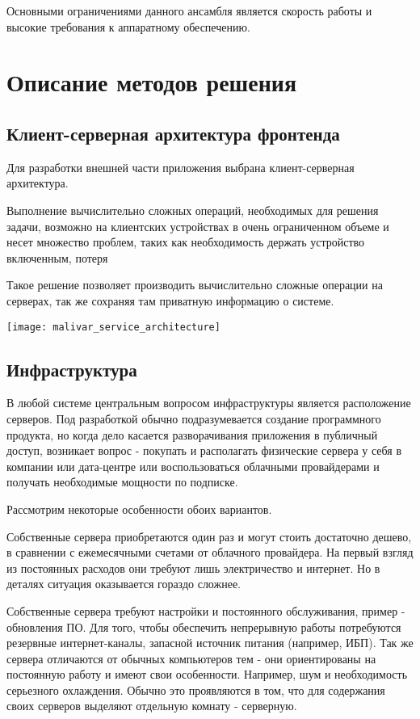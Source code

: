 Основными ограничениями данного ансамбля является скорость работы и высокие требования к аппаратному обеспечению.

\section{Описание методов решения}

\subsection{Клиент-серверная архитектура фронтенда}

Для разработки внешней части приложения выбрана клиент-серверная архитектура.

Выполнение вычислительно сложных операций, необходимых для решения задачи, возможно на клиентских устройствах в очень ограниченном объеме и несет множество проблем, таких как необходимость держать устройство включенным, потеря

Такое решение позволяет производить вычислительно сложные операции на серверах, так же сохраняя там приватную информацию о системе.

\texttt{[image: malivar\_service\_architecture]}

\subsection{Инфраструктура}

В любой системе центральным вопросом инфраструктуры является расположение серверов. Под разработкой обычно подразумевается создание программного продукта, но когда дело касается разворачивания приложения в публичный доступ, возникает вопрос - покупать и располагать физические сервера у себя в компании или дата-центре или воспользоваться облачными провайдерами и получать необходимые мощности по подписке.

Рассмотрим некоторые особенности обоих вариантов.

Собственные сервера приобретаются один раз и могут стоить достаточно дешево, в сравнении с ежемесячными счетами от облачного провайдера. На первый взгляд из постоянных расходов они требуют лишь электричество и интернет. Но в деталях ситуация оказывается гораздо сложнее.

Собственные сервера требуют настройки и постоянного обслуживания, пример - обновления ПО. Для того, чтобы обеспечить непрерывную работы потребуются резервные интернет-каналы, запасной источник питания (например, ИБП).
Так же сервера отличаются от обычных компьютеров тем - они ориентированы на постоянную работу и имеют свои особенности. Например, шум и необходимость серьезного охлаждения. Обычно это проявляются в том, что для содержания своих серверов выделяют отдельную комнату - серверную.

